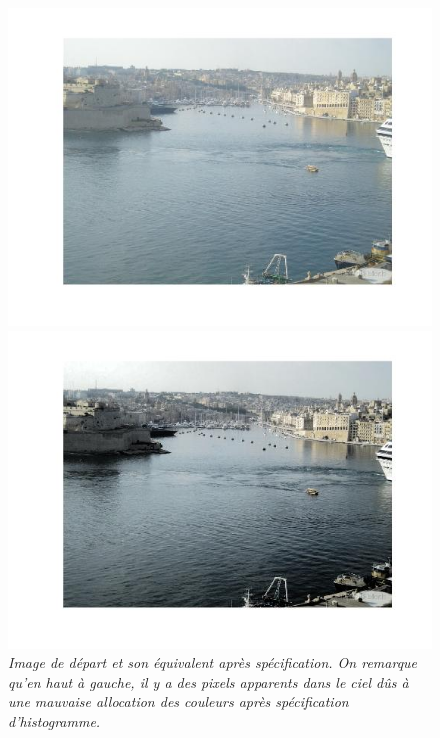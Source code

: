 \documentclass{article}
\begin{document}
\begin{figure}[!htb]
\centering
\begin{minipage}{0.5\linewidth}
\centering
\includegraphics[width=0.98\linewidth]{images/im_x.jpg}
\end{minipage}%
\begin{minipage}{0.5\linewidth}
\centering
\includegraphics[width=0.98\linewidth]{images/im_xx.jpg}
\end{minipage}
\caption{\textit{Image de départ et son équivalent après spécification. On remarque qu'en haut à gauche, il y a des pixels apparents dans le ciel dûs à une mauvaise allocation des couleurs après spécification d'histogramme.}}
\label{fig:im_x}
\end{figure}
\end{document}
